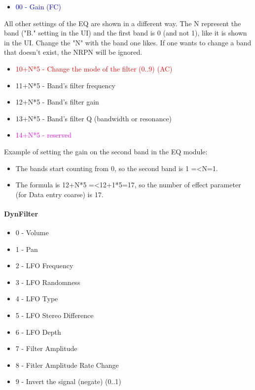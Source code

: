    \begin{itemize}
      \item \textcolor{blue}{00 - Gain (FC)}
   \end{itemize}

   All other settings of the EQ are shown in a different way.
   The N represent the band ("B." setting in the UI) and the first band is 0
   (and not 1), like it is shown in the UI.
   Change the "N" with the band one likes.
   If one wants to change a band that doesn't exist, the NRPN will be ignored.

   \begin{itemize}
      \item \textcolor{red}{10+N*5 - Change the mode of the filter (0..9) (AC)}
      \item 11+N*5 - Band's filter frequency
      \item 12+N*5 - Band's filter gain
      \item 13+N*5 - Band's filter Q (bandwidth or resonance)
      \item \textcolor{magenta}{14+N*5 - reserved}
   \end{itemize}

   Example of setting the gain on the second band in the EQ module:

   \begin{itemize}
      \item The bands start counting from 0, so the second band is
         1 =\textless N=1.
      \item The formula is 12+N*5 =\textless 12+1*5=17, so the number of effect
         parameter (for Data entry coarse) is 17.
   \end{itemize}

\paragraph{DynFilter}

   \begin{itemize}
      \item 0 - Volume
      \item 1 - Pan
      \item 2 - LFO Frequency
      \item 3 - LFO Randomness
      \item 4 - LFO Type
      \item 5 - LFO Stereo Difference
      \item 6 - LFO Depth
      \item 7 - Filter Amplitude
      \item 8 - Fitler Amplitude Rate Change
      \item 9 - Invert the signal (negate) (0..1)
   \end{itemize}


